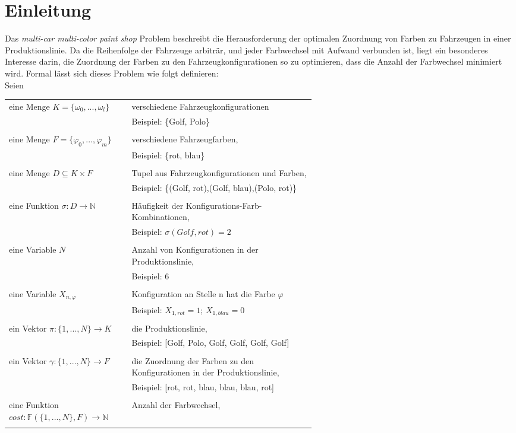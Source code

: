 
\section{Einleitung}
\label{sec:intro}

Das \textit{multi-car multi-color paint shop} Problem beschreibt die Herausforderung der optimalen Zuordnung von Farben zu Fahrzeugen in einer Produktionslinie. Da die Reihenfolge der Fahrzeuge arbiträr, und jeder Farbwechsel mit Aufwand verbunden ist, liegt ein besonderes Interesse darin, die  Zuordnung der Farben zu den Fahrzeugkonfigurationen so zu optimieren, dass die Anzahl der Farbwechsel minimiert wird. Formal lässt sich dieses Problem wie folgt definieren:\\

\noindent Seien\\
\begin{tabular}{lp{0.6\linewidth}}

eine Menge $K=\{\omega_0, ..., \omega_l\}$&verschiedene Fahrzeugkonfigurationen\\
&Beispiel: \{Golf, Polo\}\\
\\
eine Menge $F=\{\varphi_0, ..., \varphi_m\}$&verschiedene Fahrzeugfarben,\\
&Beispiel: \{rot, blau\}\\
\\
eine Menge $D\subseteq K\times F$&Tupel aus Fahrzeugkonfigurationen und Farben,\\
&Beispiel: \{(Golf, rot),(Golf, blau),(Polo, rot)\}\\
\\
eine Funktion $\sigma:D\to \mathbb{N}$&Häufigkeit der Konfigurations-Farb-Kombinationen,\\
&Beispiel: $\sigma(Golf,rot) = 2$\\
\\
eine Variable $N$&Anzahl von Konfigurationen in der Produktionslinie,\\
&Beispiel: 6\\
\\
eine Variable $X_{n,\varphi}$&Konfiguration an Stelle n hat die Farbe $\varphi$ \\
&Beispiel: $X_{1,rot} = 1$; $X_{1,blau} = 0$\\
\\
ein Vektor $\pi:\{1,...,N\}\to K$&die Produktionslinie,\\
&Beispiel: [Golf, Polo, Golf, Golf, Golf, Golf]\\
\\
ein Vektor $\gamma:\{1,...,N\}\to F$&die Zuordnung der Farben zu den Konfigurationen in der Produktionslinie,\\
&Beispiel: [rot, rot, blau, blau, blau, rot]\\
\\
eine Funktion $cost:\mathbb{F}(\{1,...,N\}, F) \to \mathbb{N}$&Anzahl der Farbwechsel,\\
\\
\end{tabular}

